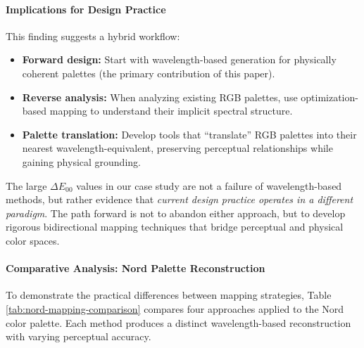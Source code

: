 \documentclass[12pt,a4paper]{article}
\newcommand{\deltaE}{\Delta E_{00}}
\begin{document}
\paragraph{Implications for Design Practice}

This finding suggests a hybrid workflow:
\begin{itemize}
\item \textbf{Forward design:} Start with wavelength-based generation for physically coherent palettes (the primary contribution of this paper).
\item \textbf{Reverse analysis:} When analyzing existing RGB palettes, use optimization-based mapping to understand their implicit spectral structure.
\item \textbf{Palette translation:} Develop tools that ``translate'' RGB palettes into their nearest wavelength-equivalent, preserving perceptual relationships while gaining physical grounding.
\end{itemize}

The large $\deltaE$ values in our case study are not a failure of wavelength-based methods, but rather evidence that \emph{current design practice operates in a different paradigm}. The path forward is not to abandon either approach, but to develop rigorous bidirectional mapping techniques that bridge perceptual and physical color spaces.

\paragraph{Comparative Analysis: Nord Palette Reconstruction}

To demonstrate the practical differences between mapping strategies, Table \ref{tab:nord-mapping-comparison} compares four approaches applied to the Nord color palette. Each method produces a distinct wavelength-based reconstruction with varying perceptual accuracy.
\end{document}
